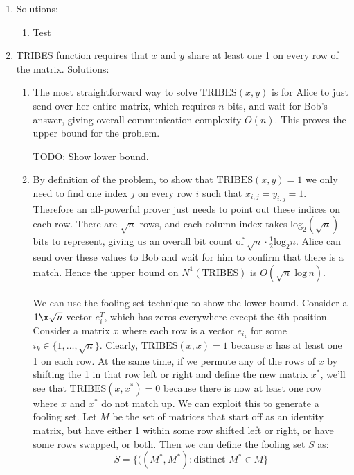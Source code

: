 \documentclass{article}
\begin{document}
\begin{enumerate}

    \item Solutions:
        \begin{enumerate}[label=(\alph*)]
            \item Test
        \end{enumerate}

    \item TRIBES function requires that $x$ and $y$ share at least one 1 on
        every row of the matrix. Solutions:
        \begin{enumerate}[label=(\alph*)]
            \item The most straightforward way to solve $\textrm{TRIBES}(x, y)$
                is for Alice to just send over her entire matrix, which
                requires $n$ bits, and wait for Bob's answer, giving overall
                communication complexity $O(n)$. This proves the upper bound
                for the problem.
                
                TODO: Show lower bound.

            \item By definition of the problem, to show that
                $\textrm{TRIBES}(x,y) = 1$ we only need to find one index $j$
                on every row $i$ such that $x_{i,j} = y_{i,j} = 1$. Therefore
                an all-powerful prover just needs to point out these indices on
                each row. There are $\sqrt{n}$ rows, and each column index
                takes $\textrm{log}_2 (\sqrt{n})$ bits to represent, giving us
                an overall bit count of $\sqrt{n} \cdot \frac{1}{2}
                \textrm{log}_2 n$. Alice can send over these values to Bob and
                wait for him to confirm that there is a match. Hence the upper
                bound on $N^1(\textrm{TRIBES})$ is $O(\sqrt{n}\;\textrm{log}\,
                n)$.
                \\\\
                We can use the fooling set technique to show the lower bound.
                Consider a $1\x\sqrt{n}$ vector $e_i^T$, which has zeros
                everywhere except the $i$th position. Consider a matrix $x$
                where each row is a vector $e_{i_k}$ for some $i_k \in \{ 1,
                \ldots, \sqrt{n} \}$. Clearly, $\textrm{TRIBES}(x, x) = 1$
                because $x$ has at least one 1 on each row. At the same time,
                if we permute any of the rows of $x$ by shifting the 1 in that
                row left or right and define the new matrix $x^*$, we'll see
                that $\textrm{TRIBES}(x, x^*) = 0$ because there is now at
                least one row where $x$ and $x^*$ do not match up. We can
                exploit this to generate a fooling set. Let $M$ be the set of
                matrices that start off as an identity matrix, but have either
                1 within some row shifted left or right, or have some rows
                swapped, or both. Then we can define the fooling set $S$ as:
                $$ S = \{ ((M^*, M^*): \textrm{distinct } M^* \in M \} $$


\end{enumerate}
\end{enumerate}
\end{document}
